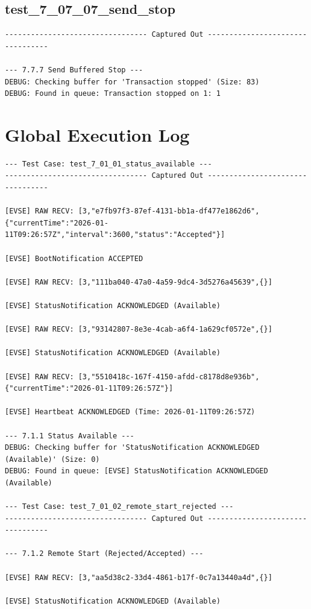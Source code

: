 \documentclass{article}
\begin{document}
\subsection*{test\_7\_07\_07\_send\_stop}
\begin{lstlisting}
--------------------------------- Captured Out ---------------------------------

--- 7.7.7 Send Buffered Stop ---
DEBUG: Checking buffer for 'Transaction stopped' (Size: 83)
DEBUG: Found in queue: Transaction stopped on 1: 1
\end{lstlisting}

\section{Global Execution Log}
\begin{lstlisting}
--- Test Case: test_7_01_01_status_available ---
--------------------------------- Captured Out ---------------------------------

[EVSE] RAW RECV: [3,"e7fb97f3-87ef-4131-bb1a-df477e1862d6",{"currentTime":"2026-01-11T09:26:57Z","interval":3600,"status":"Accepted"}]

[EVSE] BootNotification ACCEPTED

[EVSE] RAW RECV: [3,"111ba040-47a0-4a59-9dc4-3d5276a45639",{}]

[EVSE] StatusNotification ACKNOWLEDGED (Available)

[EVSE] RAW RECV: [3,"93142807-8e3e-4cab-a6f4-1a629cf0572e",{}]

[EVSE] StatusNotification ACKNOWLEDGED (Available)

[EVSE] RAW RECV: [3,"5510418c-167f-4150-afdd-c8178d8e936b",{"currentTime":"2026-01-11T09:26:57Z"}]

[EVSE] Heartbeat ACKNOWLEDGED (Time: 2026-01-11T09:26:57Z)

--- 7.1.1 Status Available ---
DEBUG: Checking buffer for 'StatusNotification ACKNOWLEDGED (Available)' (Size: 0)
DEBUG: Found in queue: [EVSE] StatusNotification ACKNOWLEDGED (Available)

--- Test Case: test_7_01_02_remote_start_rejected ---
--------------------------------- Captured Out ---------------------------------

--- 7.1.2 Remote Start (Rejected/Accepted) ---

[EVSE] RAW RECV: [3,"aa5d38c2-33d4-4861-b17f-0c7a13440a4d",{}]

[EVSE] StatusNotification ACKNOWLEDGED (Available)


\end{lstlisting}
\end{document}
